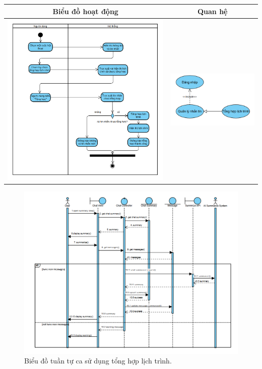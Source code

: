 \noindent 
\begin{tabular}{| c | c |}
    \hline
    \textbf{Biểu đồ hoạt động} & \textbf{Quan hệ} \\ 
    \hline
    \includegraphics[width=0.5\linewidth]{figures/c3/3-3-10-ad.png} 
    & 
    \includegraphics[width=0.45\linewidth]{figures/c3/3-3-10-rd.png} \\ 
    \hline
\end{tabular}


\vspace{0.8cm}

\begin{figure}[H]
    \centering  
    \includegraphics[width=1\textwidth]{figures/c3/3-3-10-sd.png}
    \caption{Biểu đồ tuần tự ca sử dụng tổng hợp lịch trình.}
    \label{fig:3-3-10-sequence-diagram}
\end{figure}